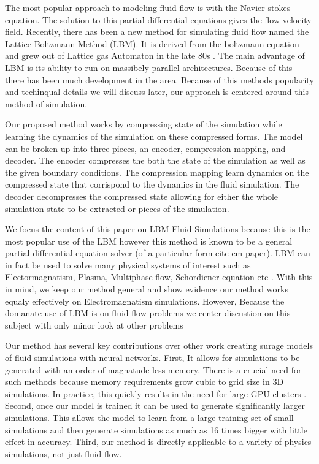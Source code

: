 \documentclass{article}
\begin{document}
The most popular approach to modeling fluid flow is with the Navier stokes equation. The solution to this partial differential equations gives the flow velocity field. Recently, there has been a new method for simulating fluid flow named the Lattice Boltzmann Method (LBM). It is derived from the boltzmann equation and grew out of Lattice gas Automaton in the late 80s \cite{mcnamara1988use}. The main advantage of LBM is its ability to run on massibely parallel architectures. Because of this there has been much development in the area. Because of this methods popularity and techinqual details we will discuss later, our approach is centered around this method of simulation.

Our proposed method works by compressing state of the simulation while learning the dynamics of the simulation on these compressed forms. The model can be broken up into three pieces, an encoder, compression mapping, and decoder. The encoder compresses the both the state of the simulation as well as the given boundary conditions. The compression mapping learn dynamics on the compressed state that corrispond to the dynamics in the fluid simulation. The decoder decompresses the compressed state allowing for either the whole simulation state to be extracted or pieces of the simulation.

We focus the content of this paper on LBM Fluid Simulations because this is the most popular use of the LBM however this method is known to be a general partial differential equation solver (of a particular form cite em paper). LBM can in fact be used to solve many physical systems of interest such as Electormagnatism, Plasma, Multiphase flow, Schordiener equation etc \cite{mendoza2010three} \cite{kim2008wavelet} \cite{zhong2006lattice} \cite{shan1993lattice}. With this in mind, we keep our method general and show evidence our method works equaly effectively on Electromagnatism simulations. However, Because the domanate use of LBM is on fluid flow problems we center discustion on this subject with only minor look at other problems

Our method has several key contributions over other work creating surage models of fluid simulations with neural networks. First, It allows for simulations to be generated with an order of magnatude less memory. There is a crucial need for such methods because memory requirements grow cubic to grid size in 3D simulations. In practice, this quickly results in the need for large GPU clusters \cite{onodera2013large} . Second, once our model is trained it can be used to generate significantly larger simulations. This allows the model to learn from a large training set of small simulations and then generate simulations as much as 16 times bigger with little effect in accuracy. Third, our method is directly applicable to a variety of physics simulations, not just fluid flow.
\end{document}
